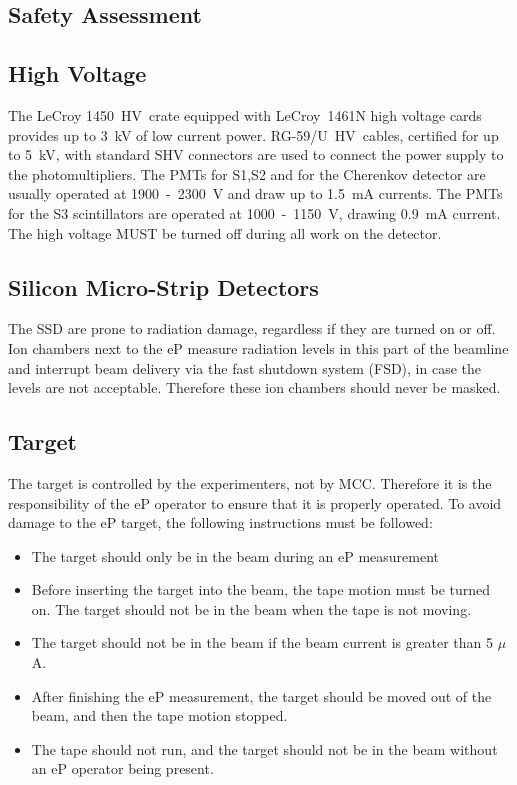 \begin{safetyen}{0}{0}
\section {Safety Assessment}
\label{sec:ep_safety}

\subsection{High Voltage}

The LeCroy 1450~HV~crate equipped with LeCroy~1461N
high voltage cards provides up to 3~kV of low current power.
RG-59/U~HV~cables, certified for up to 5~kV, with standard SHV 
connectors are used to connect the power supply to the photomultipliers.
The PMTs for S1,S2 and for the Cherenkov detector are usually operated 
at 1900~-~2300~V and draw up to 1.5~mA currents. The PMTs for the 
S3 scintillators are operated at 1000~-~1150~V, drawing 0.9~mA current.
The high voltage MUST be turned off during all work on the detector.

\subsection{Silicon Micro-Strip Detectors}

The SSD are prone to radiation damage, regardless if they are 
turned on or off. Ion chambers next to the eP measure radiation levels
in this part of the beamline and interrupt beam delivery via the
fast shutdown system (FSD), in case the levels are not acceptable. Therefore these
ion chambers should never be masked. 

\subsection{Target}

The target is controlled by the experimenters, not by MCC. Therefore it is
the responsibility of the eP operator to ensure that it is properly
operated.
To avoid damage to the eP target, the following instructions must be 
followed:
\begin{itemize}
\item The target should only be in the beam during an eP measurement
\item Before inserting the target into the beam, the tape motion must
be turned on. The target should not be in the beam when the tape is not moving. 
\item The target should not be in the beam 
if the beam current is greater than 5 $\mu$A. 
\item After finishing the eP measurement, the target should be moved out
of the beam, and then the tape motion stopped. 
\item The tape should not run, and the target should not be in the beam
without an eP operator being present.
\end{itemize}


\end{safetyen}
